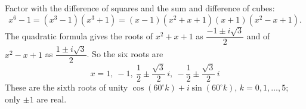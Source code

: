 Factor with the difference of squares and the sum and difference of cubes:
\[
x^6-1=(x^3-1)(x^3+1)=(x-1)(x^2+x+1)(x+1)(x^2-x+1).
\]
The quadratic formula gives the roots of $x^2+x+1$ as $\dfrac{-1\pm i\sqrt3}{2}$ and of $x^2-x+1$ as $\dfrac{1\pm i\sqrt3}{2}$. So the six roots are
\[
\boxed{x=1,\ -1,\ \dfrac{1}{2}\pm\dfrac{\sqrt3}{2}\,i,\ -\dfrac{1}{2}\pm\dfrac{\sqrt3}{2}\,i}
\]
These are the sixth roots of unity $\cos(60^\circ k)+i\sin(60^\circ k)$, $k=0,1,\dots,5$; only $\pm1$ are real.
